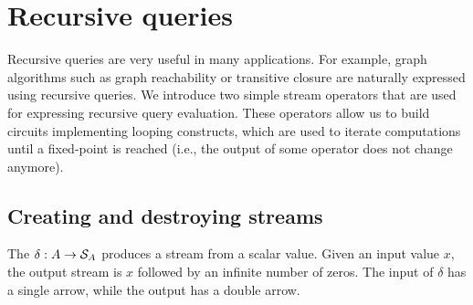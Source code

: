 \section{Recursive queries}\label{sec:recursion}

Recursive queries are very useful in many applications.  For
example, graph algorithms such as graph reachability or transitive
closure are naturally expressed using recursive queries.  We introduce
two simple \dbsp stream operators that are used for expressing
recursive query evaluation.  These operators allow us to build
circuits implementing looping constructs, which are used to iterate
computations until a fixed-point is reached (i.e., the output of some
operator does not change anymore).

\subsection{Creating and destroying streams}



The  $\delta : A \rightarrow \mathcal{S}_{A}$
produces a stream from a scalar value.  Given an input value $x$, the
output stream is $x$ followed by an infinite number of zeros.  The
input of $\delta$ has a single arrow, while the output has a double
arrow.
%
\begin{center}
\end{center}

